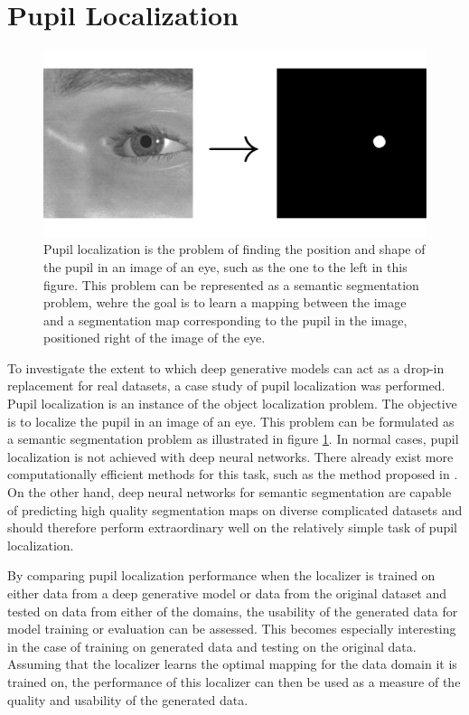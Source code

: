 \section{Pupil Localization}
\begin{figure}[t]
    \centering
    \includegraphics[width=\textwidth]{images/misc/pupil-localization.pdf}
    \caption{Pupil localization is the problem of finding the position and shape of the pupil in an image of an eye, such as the one to the left in this figure. This problem can be represented as a semantic segmentation problem, wehre the goal is to learn a mapping between the image and a segmentation map corresponding to the pupil in the image, positioned right of the image of the eye.}
    \label{fig:pupillocalization}
\end{figure}
To investigate the extent to which deep generative models can act as a drop-in replacement for real datasets, a case study of pupil localization was performed. Pupil localization is an instance of the object localization problem. The objective is to localize the pupil in an image of an eye. This problem can be formulated as a semantic segmentation problem as illustrated in figure \ref{fig:pupillocalization}. In normal cases, pupil localization is not achieved with deep neural networks. There already exist more computationally efficient methods for this task, such as the method proposed in \parencite{markuvs2014eye}. On the other hand, deep neural networks for semantic segmentation are capable of predicting high quality segmentation maps on diverse complicated datasets \parencite{ChenPK0Y16semantic} and should therefore perform extraordinary well on the relatively simple task of pupil localization.

By comparing pupil localization performance when the localizer is trained on either data from a deep generative model or data from the original dataset and tested on data from either of the domains, the usability of the generated data for model training or evaluation can be assessed. This becomes especially interesting in the case of training on generated data and testing on the original data. Assuming that the localizer learns the optimal mapping for the data domain it is trained on, the performance of this localizer can then be used as a measure of the quality and usability of the generated data. 

